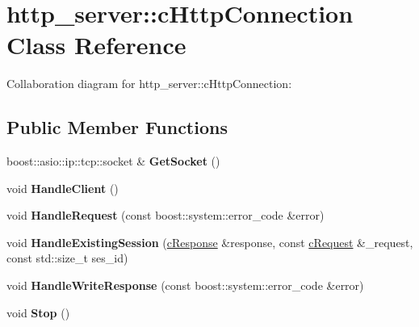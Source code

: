 \hypertarget{classhttp__server_1_1cHttpConnection}{\section{http\-\_\-server\-:\-:c\-Http\-Connection Class Reference}
\label{classhttp__server_1_1cHttpConnection}
}


Collaboration diagram for http\-\_\-server\-:\-:c\-Http\-Connection\-:
\subsection*{Public Member Functions}
\begin{DoxyCompactItemize}
\item 
\hypertarget{classhttp__server_1_1cHttpConnection_ad9175494a963a2e2f7fafb31c24c4783}{boost\-::asio\-::ip\-::tcp\-::socket \& {\bfseries Get\-Socket} ()}\label{classhttp__server_1_1cHttpConnection_ad9175494a963a2e2f7fafb31c24c4783}

\item 
\hypertarget{classhttp__server_1_1cHttpConnection_a0559eb591a884a16d90f2e061a5530f6}{void {\bfseries Handle\-Client} ()}\label{classhttp__server_1_1cHttpConnection_a0559eb591a884a16d90f2e061a5530f6}

\item 
\hypertarget{classhttp__server_1_1cHttpConnection_aad4d12163015ab391b40bb15b9a5ecb0}{void {\bfseries Handle\-Request} (const boost\-::system\-::error\-\_\-code \&error)}\label{classhttp__server_1_1cHttpConnection_aad4d12163015ab391b40bb15b9a5ecb0}

\item 
\hypertarget{classhttp__server_1_1cHttpConnection_a37b521633163cac94a61206a92d62b2a}{void {\bfseries Handle\-Existing\-Session} (\hyperlink{classhttp__server_1_1cResponse}{c\-Response} \&response, const \hyperlink{classhttp__server_1_1cRequest}{c\-Request} \&\-\_\-request, const std\-::size\-\_\-t ses\-\_\-id)}\label{classhttp__server_1_1cHttpConnection_a37b521633163cac94a61206a92d62b2a}

\item 
\hypertarget{classhttp__server_1_1cHttpConnection_a128cc40027898c87335516147b767b87}{void {\bfseries Handle\-Write\-Response} (const boost\-::system\-::error\-\_\-code \&error)}\label{classhttp__server_1_1cHttpConnection_a128cc40027898c87335516147b767b87}

\item 
\hypertarget{classhttp__server_1_1cHttpConnection_aac06a1408cb3b2e20e08817858e45443}{void {\bfseries Stop} ()}\label{classhttp__server_1_1cHttpConnection_aac06a1408cb3b2e20e08817858e45443}

\end{DoxyCompactItemize}
